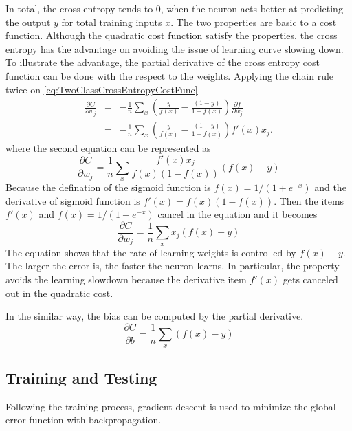 In total, the cross entropy tends to $0$, when the neuron acts better at predicting the output $y$ for total training inputs $x$. The two properties are basic to a cost function. Although the quadratic cost function satisfy the properties, the cross entropy has the advantage on avoiding the issue of learning curve slowing down. To illustrate the advantage, the partial derivative of the cross entropy cost function can be done with the respect to the weights. Applying the chain rule twice on \ref{eq:TwoClassCrossEntropyCostFunc}
\begin{eqnarray}\label{eq:DerCrossEntropyCostFunc}
  \frac{\partial C}{\partial w_j} & = & -\frac{1}{n} \sum_x \left(
    \frac{y }{f(x)} -\frac{(1-y)}{1-f(x)} \right)
  \frac{\partial f}{\partial w_j} \\
 & = & -\frac{1}{n} \sum_x \left( 
    \frac{y}{f(x)}-\frac{(1-y)}{1-f(x)} \right)f'(x) x_j.
\end{eqnarray}
where the second equation can be represented as
\begin{equation}\label{eq:SecondDerCrossEntropyCostFunc}
  \frac{\partial C}{\partial w_j} = \frac{1}{n}  \sum_x \frac{f'(x) x_j}{f(x) (1-f(x))} (f(x)-y)
\end{equation}
Because the defination of the sigmoid function is $f(x) =1/(1+e^{-x})$ and the derivative of sigmoid function is $f'(x) =f(x)(1-f(x))$. Then the items $f'(x)$ and $f(x) =1/(1+e^{-x})$ cancel in the equation and it becomes
\begin{equation}\label{eq:SimDerCrossEntropyCostFunc}
 \frac{\partial C}{\partial w_j} =  \frac{1}{n} \sum_x x_j(f(x)-y)
\end{equation}
The equation shows that the rate of learning weights is controlled by $f(x) - y$. The larger the error is, the faster the neuron learns. In particular, the property avoids the learning slowdown because the derivative item $f'(x)$ gets canceled out in the quadratic cost.

In the similar way, the bias can be computed by the partial derivative.
\begin{equation}\label{eq:BiasCrossEntropyCostFunc}
\frac{\partial C}{\partial b} = \frac{1}{n} \sum_x (f(x)-y)
\end{equation}


\subsection{Training and Testing}

Following the training process, gradient descent is used to minimize the global error function with backpropagation. 

